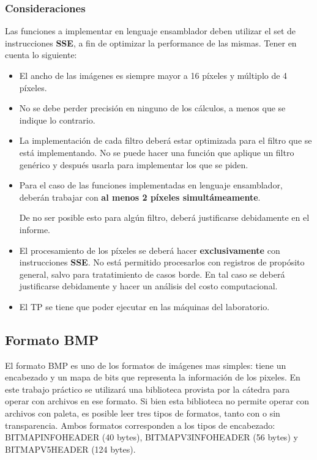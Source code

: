 \documentclass[a4paper, 12pt]{article}
\begin{document}
\subsubsection*{Consideraciones}

Las funciones a implementar en lenguaje ensamblador deben utilizar el set de
instrucciones \textbf{SSE}, a fin de optimizar la performance de las mismas.
Tener en cuenta lo siguiente:

\begin{itemize}
  \itemsep0em
  \item El ancho de las imágenes es siempre mayor a 16 píxeles y múltiplo de 4 píxeles.

  \item No se debe perder precisión en ninguno de los cálculos, a menos que se indique lo contrario.

  \item La implementación de cada filtro deberá estar optimizada para el
    filtro que se está implementando. No se puede hacer una función que
    aplique un filtro genérico y después usarla para implementar los que se
    piden.

  \item Para el caso de las funciones implementadas en lenguaje ensamblador,
    deberán trabajar con \textbf{al menos 2 píxeles simultámeamente}.

    De no ser posible esto para algún filtro, deberá justificarse
    debidamente en el informe.

  \item El procesamiento de los píxeles se deberá hacer
    \textbf{exclusivamente} con instrucciones \textbf{SSE}.
    No está permitido procesarlos con registros de propósito general,
    salvo para tratatimiento de casos borde. En tal caso se deberá
    justificarse debidamente y hacer un análisis del costo computacional.

  \item El TP se tiene que poder ejecutar en las máquinas del laboratorio.
\end{itemize}



\subsection{Formato BMP}

El formato BMP es uno de los formatos de imágenes mas simples: tiene un encabezado y un mapa de bits que representa la información de los pixeles.
En este trabajo práctico se utilizará una biblioteca provista por la cátedra para operar con archivos en ese formato.
Si bien esta biblioteca no permite operar con archivos con paleta, es posible leer tres tipos de formatos, tanto con o sin transparencia.
Ambos formatos corresponden a los tipos de encabezado: BITMAPINFOHEADER (40 bytes), BITMAPV3INFOHEADER (56 bytes) y BITMAPV5HEADER (124 bytes).
\smallskip
\end{document}
